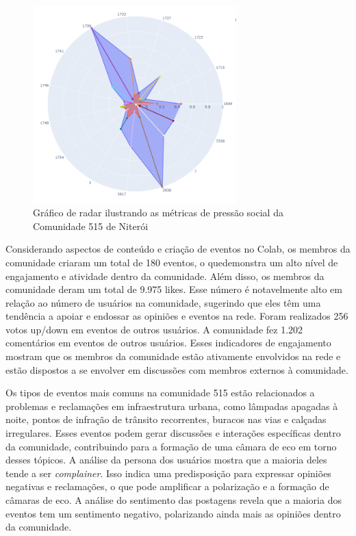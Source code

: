 \begin{figure}[htb]
	\centering
	\includegraphics[width=0.7\textwidth]{images/niteroi_community_515.png}
	\caption{Gráfico de radar ilustrando as métricas de pressão social da Comunidade 515 de Niterói}
	\label{fig:niteroi_community_515}
\end{figure}

Considerando aspectos de conteúdo e criação de eventos no Colab, os membros da comunidade criaram um total de 180 eventos, o quedemonstra um alto nível de engajamento e atividade dentro da comunidade. Além disso, os membros da comunidade deram um total de 9.975 likes. Esse número é notavelmente alto em relação ao número de usuários na comunidade, sugerindo que eles têm uma tendência a apoiar e endossar as opiniões e eventos na rede. Foram realizados 256 votos up/down em eventos de outros usuários. A comunidade fez 1.202 comentários em eventos de outros usuários. Esses indicadores de engajamento mostram que os membros da comunidade estão ativamente envolvidos na rede e estão dispostos a se envolver em discussões com membros externos à comunidade.

Os tipos de eventos mais comuns na comunidade 515 estão relacionados a problemas e reclamações em infraestrutura urbana, como lâmpadas apagadas à noite, pontos de infração de trânsito recorrentes, buracos nas vias e calçadas irregulares. Esses eventos podem gerar discussões e interações específicas dentro da comunidade, contribuindo para a formação de uma câmara de eco em torno desses tópicos. A análise da persona dos usuários mostra que a maioria deles tende a ser \textit{complainer}. Isso indica uma predisposição para expressar opiniões negativas e reclamações, o que pode amplificar a polarização e a formação de câmaras de eco. A análise do sentimento das postagens revela que a maioria dos eventos tem um sentimento negativo, polarizando ainda mais as opiniões dentro da comunidade.


